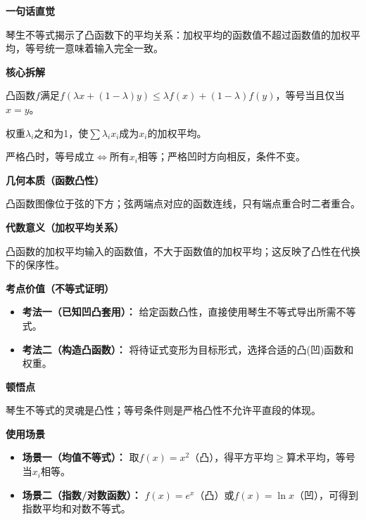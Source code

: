 \begin{explanationbox}
	\textbf{\textcolor{CExplanation}{一句话直觉}}

	琴生不等式揭示了凸函数下的平均关系：加权平均的函数值不超过函数值的加权平均，等号统一意味着输入完全一致。

	\medskip
	\textbf{\textcolor{CExplanation}{核心拆解}}
	\begin{description}[style=nextline, leftmargin=2.8em, labelsep=0.5em, itemsep=0.45em]
		\item[\textbf{要点一（凸性定义）：}] 凸函数$f$满足$f(\lambda x+(1-\lambda)y)\le\lambda f(x)+(1-\lambda)f(y)$，等号当且仅当$x=y$。
		\item[\textbf{要点二（权重归一）：}] 权重$\lambda_i$之和为1，使$\sum\lambda_i x_i$成为$x_i$的加权平均。
		\item[\textbf{要点三（取等条件）：}] 严格凸时，等号成立$\iff$所有$x_i$相等；严格凹时方向相反，条件不变。
	\end{description}

	\medskip
	\textbf{\textcolor{CExplanation}{几何本质（函数凸性）}}

	凸函数图像位于弦的下方；弦两端点对应的函数连线，只有端点重合时二者重合。

	\medskip
	\textbf{\textcolor{CExplanation}{代数意义（加权平均关系）}}

	凸函数的加权平均输入的函数值，不大于函数值的加权平均；这反映了凸性在代换下的保序性。

	\medskip
	\textbf{\textcolor{CExplanation}{考点价值（不等式证明）}}
	\begin{itemize}[leftmargin=*, itemsep=0.5em, topsep=0.4em]
		\item \textbf{考法一（已知凹凸套用）：} 给定函数凸性，直接使用琴生不等式导出所需不等式。
		\item \textbf{考法二（构造凸函数）：} 将待证式变形为目标形式，选择合适的凸(凹)函数和权重。
	\end{itemize}

	\medskip
	\textbf{\textcolor{CExplanation}{顿悟点}}

	琴生不等式的灵魂是凸性；等号条件则是严格凸性不允许平直段的体现。

	\medskip
	\textbf{\textcolor{CExplanation}{使用场景}}
	\begin{itemize}[leftmargin=*, itemsep=0.5em, topsep=0.4em]
		\item \textbf{场景一（均值不等式）：} 取$f(x)=x^2$（凸），得平方平均$\ge$算术平均，等号当$x_i$相等。
		\item \textbf{场景二（指数/对数函数）：} $f(x)=e^x$（凸）或$f(x)=\ln x$（凹），可得到指数平均和对数不等式。
	\end{itemize}
\end{explanationbox}
